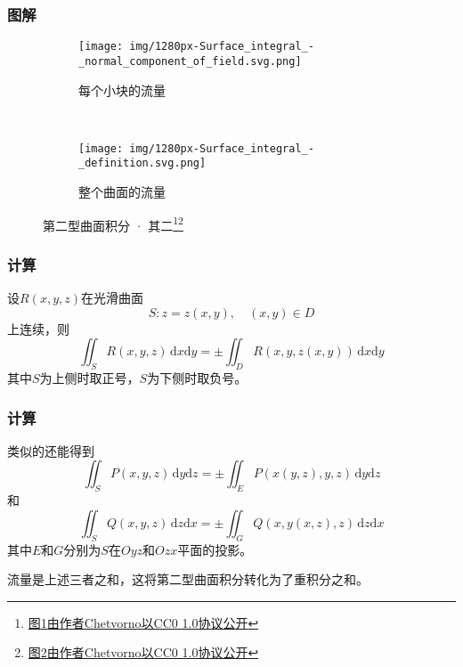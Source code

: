 \documentclass[xetex]{beamer}
\begin{document}
    \begin{frame}
        \frametitle{图解}
    
        \begin{figure}[ht]
            \centering
            \begin{subfigure}[b]{.4\textwidth}
                \texttt{[image: img/1280px-Surface\_integral\_-\_normal\_component\_of\_field.svg.png]}
                \caption{每个小块的流量}
                \label{fig:intplate-2a}
            \end{subfigure}
            ~
            \begin{subfigure}[b]{.4\textwidth}
                \texttt{[image: img/1280px-Surface\_integral\_-\_definition.svg.png]}
                \caption{整个曲面的流量}
                \label{fig:intplate-2b}
            \end{subfigure}
            \caption{第二型曲面积分 · 其二\footnote[1]{\href{https://commons.wikimedia.org/wiki/File:Surface_integral_-_normal_component_of_field.svg}{图\ref{fig:intplate-2a}由作者Chetvorno以CC0 1.0协议公开}}\footnote[2]{\href{https://commons.wikimedia.org/wiki/File:Surface_integral_-_definition.svg}{图\ref{fig:intplate-2b}由作者Chetvorno以CC0 1.0协议公开}}}
            \label{fig:intplate-1}
        \end{figure}
    
    \end{frame}

    \begin{frame}
        \frametitle{计算}
    
        设$R(x,y,z)$在光滑曲面$$S:z=z(x,y),\quad (x,y)\in D$$
        上连续，则
        $$\iint_SR(x,y,z)\,\mathrm{d}x\mathrm{d}y = \pm \iint_DR(x,y,z(x,y))\,\mathrm{d}x\mathrm{d}y$$
        其中$S$为上侧时取正号，$S$为下侧时取负号。
    
    \end{frame}

    \begin{frame}
        \frametitle{计算}
    
        类似的还能得到
        $$\iint_SP(x,y,z)\,\mathrm{d}y\mathrm{d}z = \pm \iint_EP(x(y,z),y,z)\,\mathrm{d}y\mathrm{d}z$$
        和
        $$\iint_SQ(x,y,z)\,\mathrm{d}z\mathrm{d}x = \pm \iint_GQ(x,y(x,z),z)\,\mathrm{d}z\mathrm{d}x$$
        其中$E$和$G$分别为$S$在$Oyz$和$Ozx$平面的投影。\pause

        流量是上述三者之和，这将第二型曲面积分转化为了\alert{重积分}之和。
    
    \end{frame}
\end{document}
